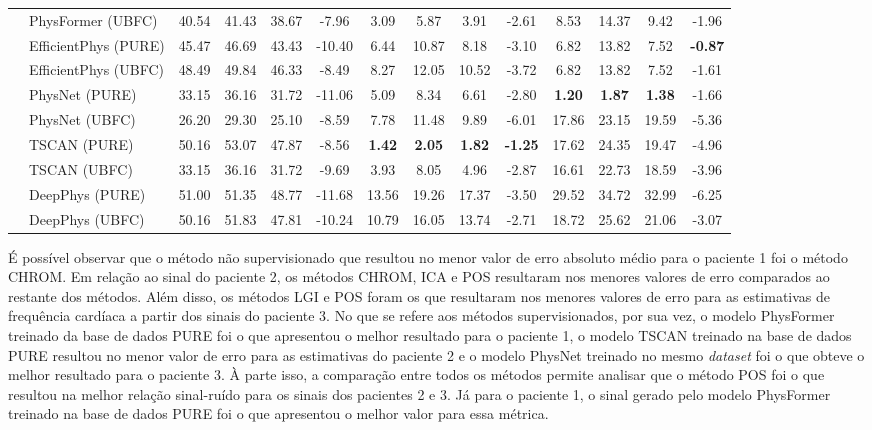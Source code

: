 \begin{table}[htbp]
{\begin{tabular}{llcccccccccccc}
& PhysFormer (UBFC) 
& 40.54 & 41.43 & 38.67 & -7.96
& 3.09 & 5.87 & 3.91 & -2.61
& 8.53 & 14.37 & 9.42 & -1.96 \\

& EfficientPhys (PURE) 
& 45.47 & 46.69 & 43.43 & -10.40
& 6.44 & 10.87 & 8.18 & -3.10
& 6.82 & 13.82 & 7.52 & \textbf{-0.87} \\

& EfficientPhys (UBFC) 
& 48.49 & 49.84 & 46.33 & -8.49
& 8.27 & 12.05 & 10.52 & -3.72
& 6.82 & 13.82 & 7.52 & -1.61 \\

& PhysNet (PURE) 
& 33.15 & 36.16 & 31.72 & -11.06
& 5.09 & 8.34 & 6.61 & -2.80
& \textbf{1.20} & \textbf{1.87} & \textbf{1.38} & -1.66 \\

& PhysNet (UBFC) 
& 26.20 & 29.30 & 25.10 & -8.59
& 7.78 & 11.48 & 9.89 & -6.01
& 17.86 & 23.15 & 19.59 & -5.36 \\

& TSCAN (PURE) 
& 50.16 & 53.07 & 47.87 & -8.56
& \textbf{1.42} & \textbf{2.05} & \textbf{1.82} & \textbf{-1.25}
& 17.62 & 24.35 & 19.47 & -4.96 \\

& TSCAN (UBFC) 
& 33.15 & 36.16 & 31.72 & -9.69
& 3.93 & 8.05 & 4.96 & -2.87
& 16.61 & 22.73 & 18.59 & -3.96 \\

& DeepPhys (PURE) 
& 51.00 & 51.35 & 48.77 & -11.68
& 13.56 & 19.26 & 17.37 & -3.50
& 29.52 & 34.72 & 32.99 & -6.25 \\

& DeepPhys (UBFC) 
& 50.16 & 51.83 & 47.81 & -10.24
& 10.79 & 16.05 & 13.74 & -2.71
& 18.72 & 25.62 & 21.06 & -3.07 \\

\hline
\end{tabular}
}
\label{tab:rppg_ecg_metrics_all}
\end{table}

É possível observar que o método não supervisionado que resultou no menor valor de erro absoluto médio para o paciente 1 foi o método CHROM. Em relação ao sinal do paciente 2, os métodos CHROM, ICA e POS resultaram nos menores valores de erro comparados ao restante dos métodos. Além disso, os métodos LGI e POS foram os que resultaram nos menores valores de erro para as estimativas de frequência cardíaca a partir dos sinais do paciente 3. No que se refere aos métodos supervisionados, por sua vez, o modelo PhysFormer treinado da base de dados PURE foi o que apresentou o melhor resultado para o paciente 1, o modelo TSCAN treinado na base de dados PURE resultou no menor valor de erro para as estimativas do paciente 2 e o modelo PhysNet treinado no mesmo \textit{dataset} foi o que obteve o melhor resultado para o paciente 3. À parte isso, a comparação entre todos os métodos permite analisar que o método POS foi o que resultou na melhor relação sinal-ruído para os sinais dos pacientes 2 e 3. Já para o paciente 1, o sinal gerado pelo modelo PhysFormer treinado na base de dados PURE foi o que apresentou o melhor valor para essa métrica.

